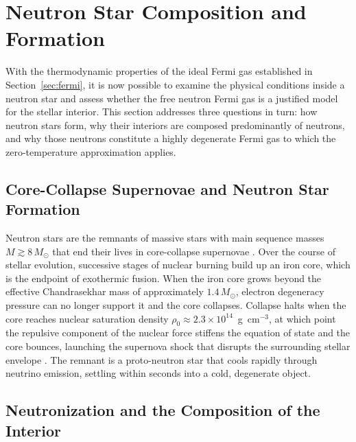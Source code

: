 \section{Neutron Star Composition and Formation}
\label{sec:composition}
 
With the thermodynamic properties of the ideal Fermi gas established in
Section~\ref{sec:fermi}, it is now possible to examine the physical
conditions inside a neutron star and assess whether the free neutron
Fermi gas is a justified model for the stellar interior. This section
addresses three questions in turn: how neutron stars form, why their
interiors are composed predominantly of neutrons, and why those neutrons
constitute a highly degenerate Fermi gas to which the zero-temperature
approximation applies.
 
\subsection{Core-Collapse Supernovae and Neutron Star Formation}
 
Neutron stars are the remnants of massive stars with main
sequence masses $M \gtrsim 8\,M_\odot$ that end their lives in
core-collapse supernovae \cite{Heger2003}. Over the course of stellar
evolution, successive stages of nuclear burning build up an iron core,
which is the endpoint of exothermic fusion. When the iron core grows
beyond the effective Chandrasekhar mass of approximately $1.4\,M_\odot$,
electron degeneracy pressure can no longer support it and the core
collapses. Collapse halts when the core reaches nuclear saturation
density $\rho_0 \approx 2.3 \times 10^{14}$~g~cm$^{-3}$, at which
point the repulsive component of the nuclear force stiffens the equation
of state and the core bounces, launching the supernova shock that
disrupts the surrounding stellar envelope \cite{Burrows2021}. The
remnant is a proto-neutron star that cools rapidly through neutrino
emission, settling within seconds into a cold, degenerate object.

 
\subsection{Neutronization and the Composition of the Interior}
 
